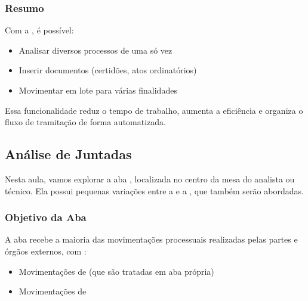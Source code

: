 \documentclass[letterpaper,10pt,brazil]{sphinxmanual}
\begin{document}
\subsubsection{Resumo}
\label{\detokenize{projud_04_analisemultipla:resumo}}
\sphinxAtStartPar
Com a , é possível:
\begin{itemize}
\item {} 
\sphinxAtStartPar
Analisar diversos processos de uma só vez

\item {} 
\sphinxAtStartPar
Inserir documentos (certidões, atos ordinatórios)

\item {} 
\sphinxAtStartPar
Movimentar em lote para várias finalidades

\end{itemize}

\sphinxAtStartPar
Essa funcionalidade reduz o tempo de trabalho, aumenta a eficiência e organiza o fluxo de tramitação de forma automatizada.

\sphinxstepscope


\subsection{Análise de Juntadas}
\label{\detokenize{projud_05_analisejuntada:analise-de-juntadas}}\label{\detokenize{projud_05_analisejuntada::doc}}
\sphinxAtStartPar
Nesta aula, vamos explorar a aba , localizada no centro da mesa do analista ou técnico. Ela possui pequenas variações entre a  e a , que também serão abordadas.


\subsubsection{Objetivo da Aba}
\label{\detokenize{projud_05_analisejuntada:objetivo-da-aba}}
\sphinxAtStartPar
A aba  recebe a maioria das movimentações processuais realizadas pelas partes e órgãos externos, com :
\begin{itemize}
\item {} 
\sphinxAtStartPar
Movimentações de  (que são tratadas em aba própria)

\item {} 
\sphinxAtStartPar
Movimentações de 

\end{itemize}
\end{document}
